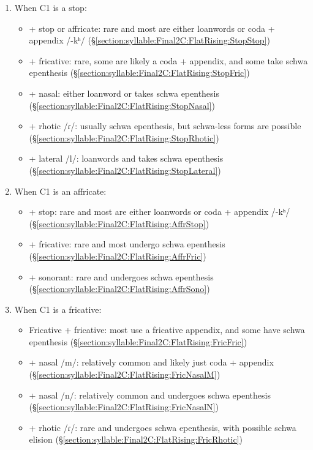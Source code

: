 	\begin{enumerate}[noitemsep,topsep=0pt]
		\item When C1 is a stop:
		\begin{itemize}
			\item  + stop or affricate: rare and most are either loanwords or coda + appendix /-kʰ/ (\S\ref{section:syllable:Final2C:FlatRising:StopStop})
			\item  + fricative: rare, some are likely a coda + appendix, and some take schwa epenthesis  (\S\ref{section:syllable:Final2C:FlatRising:StopFric})
			\item  + nasal: either loanword or takes schwa epenthesis  (\S\ref{section:syllable:Final2C:FlatRising:StopNasal})
			\item  + rhotic /ɾ/: usually schwa epenthesis, but schwa-less forms are possible (\S\ref{section:syllable:Final2C:FlatRising:StopRhotic})
			\item  + lateral /l/: loanwords and takes schwa epenthesis (\S\ref{section:syllable:Final2C:FlatRising:StopLateral})
		\end{itemize}
		\item When C1 is an affricate:
		\begin{itemize}
			\item   + stop: rare and most are either loanwords or coda + appendix /-kʰ/ (\S\ref{section:syllable:Final2C:FlatRising:AffrStop})
			\item  + fricative: rare and most   undergo schwa epenthesis  (\S\ref{section:syllable:Final2C:FlatRising:AffrFric})
			\item  + sonorant: rare and undergoes schwa epenthesis  (\S\ref{section:syllable:Final2C:FlatRising:AffrSono})
		\end{itemize}
		\item When C1 is a fricative:
		\begin{itemize}
			\item Fricative + fricative: most use a fricative appendix, and some have  schwa epenthesis  (\S\ref{section:syllable:Final2C:FlatRising:FricFric})
			\item  + nasal /m/: relatively common and likely just coda + appendix (\S\ref{section:syllable:Final2C:FlatRising:FricNasalM})
			\item  + nasal /n/: relatively common and undergoes schwa epenthesis (\S\ref{section:syllable:Final2C:FlatRising:FricNasalN})
			\item  + rhotic /ɾ/: rare  and  undergoes schwa epenthesis, with possible schwa elision (\S\ref{section:syllable:Final2C:FlatRising:FricRhotic})

\end{itemize}
\end{enumerate}
